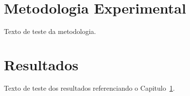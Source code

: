 \documentclass[12pt,a4paper]{report}
\begin{document}
\chapter{Metodologia Experimental}\label{cap:estudo_caso}
Texto de teste da metodologia.
\chapter{Resultados}\label{cap:resultados}
Texto de teste dos resultados referenciando o Capitulo~\ref{cap:estudo_caso}.
\end{document}
